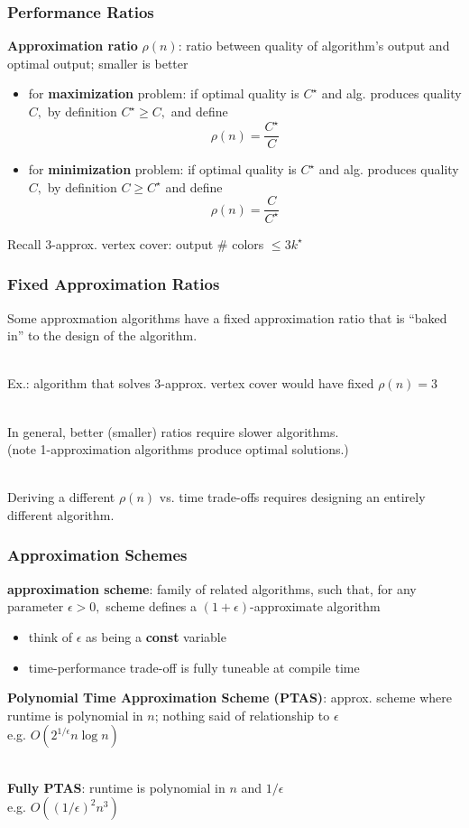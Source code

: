 \documentclass{beamer}
\newcommand{\stanza}{ \\~\ }
\begin{document}
\begin{frame} \frametitle{Performance Ratios}
\textbf{Approximation ratio} $\rho(n)$: ratio between quality of algorithm's output
and optimal output; smaller is better
\begin{itemize}
  \item for \textbf{maximization} problem: if optimal quality is $C^\star$ and alg. produces
    quality $C,$ by definition $C^\star \geq C,$ and define
    \[ \rho(n) = \frac{C^\star}{C} \]
  \item for \textbf{minimization} problem: if optimal quality is $C^\star$ and alg. produces
    quality $C,$ by definition $C \geq C^\star$ and define
    \[ \rho(n) = \frac{C}{C^\star} \]
\end{itemize}
Recall 3-approx. vertex cover: output \# colors $\leq 3 k^\star$
\end{frame}

\begin{frame} \frametitle{Fixed Approximation Ratios}
Some approxmation algorithms have a fixed approximation ratio that is
``baked in'' to the design of the algorithm. \stanza

Ex.: algorithm that solves 3-approx. vertex cover would have fixed $\rho(n)=3$
\stanza

In general, better (smaller) ratios require slower algorithms. \\
(note 1-approximation algorithms produce optimal solutions.) \stanza

Deriving a different $\rho(n)$ vs. time trade-offs requires designing an
entirely different algorithm.
\end{frame}

\begin{frame} \frametitle{Approximation Schemes}
\textbf{approximation scheme}: family of related algorithms, such that, for
any parameter $\epsilon > 0,$ scheme defines a
$(1+\epsilon)$-approximate algorithm
\begin{itemize}
  \item think of $\epsilon$ as being a \textbf{const} variable
  \item time-performance trade-off is fully tuneable at compile time
\end{itemize}

\textbf{Polynomial Time Approximation Scheme (PTAS)}: approx. scheme where runtime
is polynomial in $n$; nothing said of relationship to $\epsilon$ \\
e.g. $O(2^{1/\epsilon} n \log n)$ \stanza

\textbf{Fully PTAS}: runtime is polynomial in $n$ and $1/\epsilon$ \\
e.g. $O((1/\epsilon)^2 n^3)$
\end{frame}
\end{document}
